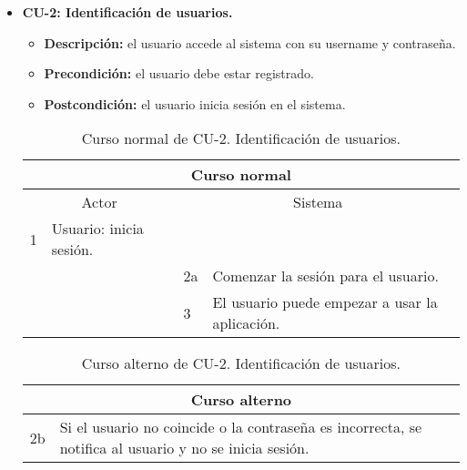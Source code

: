 \begin{itemize}
	\item \textbf{CU-2: Identificación de usuarios.}
	\begin{itemize}
		\item \textbf{Descripción:} el usuario accede al sistema con su username y contraseña.
		\item \textbf{Precondición:} el usuario debe estar registrado.
		\item \textbf{Postcondición:} el usuario inicia sesión en el sistema.
	\end{itemize}
	\begin{table}[H]
		\centering
		\begin{tabular}{|p{0.3cm}|p{5cm}|p{0.3cm}|p{5cm}|}
			\hline
			\multicolumn{4}{|c|}{Curso normal} \\ \hline
			\multicolumn{2}{|c|}{Actor} & \multicolumn{2}{|c|}{Sistema} \\ \hline
			1 & Usuario: inicia sesión. &  &  \\ \hline
			&  & 2a & Comenzar la sesión para el usuario. \\ \hline
			&  & 3 & El usuario puede empezar a usar la aplicación. \\ \hline
		\end{tabular}
		\caption{Curso normal de CU-2. Identificación de usuarios.}
		\label{tabla:cu2-normal}
	\end{table}
	
	\begin{table}[H]
		\centering
		\begin{tabular}{|p{0.3cm}|p{10cm}|}
			\hline
			\multicolumn{2}{|c|}{Curso alterno} \\ \hline
			2b & Si el usuario no coincide o la contraseña es incorrecta, se notifica al usuario y no se inicia sesión. \\ \hline
		\end{tabular}
		\caption{Curso alterno de CU-2. Identificación de usuarios.}
		\label{tabla:cu2-alterno}
	\end{table}
\end{itemize}

